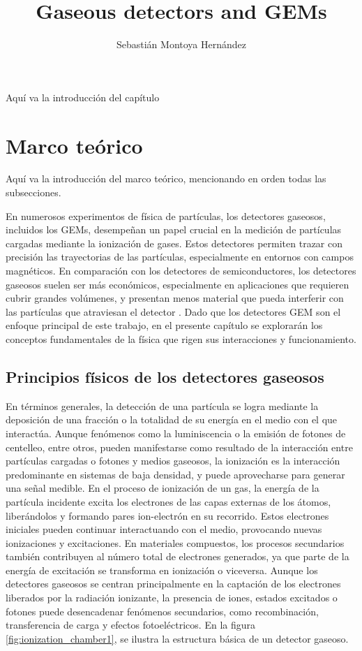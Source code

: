 \documentclass{article}
\title{\textbf{Gaseous detectors and GEMs} }
\author{Sebastián Montoya Hernández}
\begin{document}
\maketitle 
\setcounter{section}{0}
Aquí va la introducción del capítulo
\newpage
\section{Marco teórico}

Aquí va la introducción del marco teórico, mencionando en orden todas las subsecciones.

En numerosos experimentos de física de partículas, los detectores gaseosos, incluidos los GEMs, desempeñan un papel crucial en la medición de partículas cargadas mediante la ionización de gases. Estos detectores permiten trazar con precisión las trayectorias de las partículas, especialmente en entornos con campos magnéticos. En comparación con los detectores de semiconductores, los detectores gaseosos suelen ser más económicos, especialmente en aplicaciones que requieren cubrir grandes volúmenes, y presentan menos material que pueda interferir con las partículas que atraviesan el detector \cite{sauli2015gaseous}. Dado que los detectores GEM son el enfoque principal de este trabajo, en el presente capítulo se explorarán los conceptos fundamentales de la física que rigen sus interacciones y funcionamiento.

\subsection{Principios físicos de los detectores gaseosos}

\noindent En términos generales, la detección de una partícula se logra mediante la deposición de una fracción o la totalidad de su energía en el medio con el que interactúa. Aunque fenómenos como la luminiscencia o la emisión de fotones de centelleo, entre otros, pueden manifestarse como resultado de la interacción entre partículas cargadas o fotones y medios gaseosos, la ionización es la interacción predominante en sistemas de baja densidad, y puede aprovecharse para generar una señal medible. En el proceso de ionización de un gas, la energía de la partícula incidente excita los electrones de las capas externas de los átomos, liberándolos y formando pares ion-electrón en su recorrido. Estos electrones iniciales pueden continuar interactuando con el medio, provocando nuevas ionizaciones y excitaciones. En materiales compuestos, los procesos secundarios también contribuyen al número total de electrones generados, ya que parte de la energía de excitación se transforma en ionización o viceversa. Aunque los detectores gaseosos se centran principalmente en la captación de los electrones liberados por la radiación ionizante, la presencia de iones, estados excitados o fotones puede desencadenar fenómenos secundarios, como recombinación, transferencia de carga y efectos fotoeléctricos. En la figura \ref{fig:ionization_chamber1}, se ilustra la estructura básica de un detector gaseoso.
\end{document}
